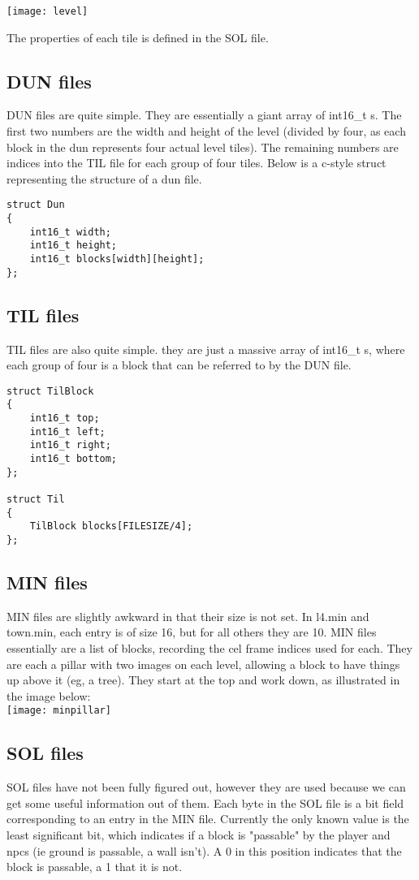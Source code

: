     \begin{center}\texttt{[image: level]}\end{center}
    
    The properties of each tile is defined in the SOL file.

    \subsection{DUN files}
    DUN files are quite simple. They are essentially a giant array of int16\_t s. The first two numbers are the width and height of the level (divided by four, as each block in the dun represents four actual level tiles). The remaining numbers are indices into the TIL file for each group of four tiles. Below is a c-style struct representing the structure of a dun file.
    \begin{lstlisting}
struct Dun
{
    int16_t width;
    int16_t height;
    int16_t blocks[width][height];
};
    \end{lstlisting}

    \subsection{TIL files}
    TIL files are also quite simple. they are just a massive array of int16\_t s, where each group of four is a block that can be referred to by the DUN file.

    \begin{lstlisting}
struct TilBlock
{
    int16_t top;
    int16_t left;
    int16_t right;
    int16_t bottom;
};

struct Til
{
    TilBlock blocks[FILESIZE/4];
};
    \end{lstlisting}

    \subsection{MIN files}
    MIN files are slightly awkward in that their size is not set. In l4.min and town.min, each entry is of size 16, but for all others they are 10.
    MIN files essentially are a list of blocks, recording the cel frame indices used for each. They are each a pillar with two images on each level, allowing a block to have things up above it (eg, a tree). They start at the top and work down, as illustrated in the image below:\\
    \texttt{[image: minpillar]}
    
    \subsection{SOL files}
    SOL files have not been fully figured out, however they are used because we can get some useful information out of them.
    Each byte in the SOL file is a bit field corresponding to an entry in the MIN file. Currently the only known value is the least significant bit, which indicates if a block is "passable" by the player and npcs (ie ground is passable, a wall isn't). A 0 in this position indicates that the block is passable, a 1 that it is not.
